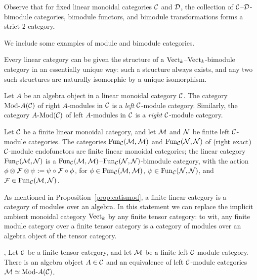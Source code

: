 \documentclass{amsart}
\begin{document}
\nid Observe that for fixed linear monoidal categories $\mathcal C$ and $\mathcal D$, the collection of $\mathcal C$--$\mathcal D$-bimodule categories, bimodule functors, and bimodule transformations forms a strict 2-category.

We include some examples of module and bimodule categories.

\begin{example}
Every linear category can be given the structure of a $\mathrm{Vect}_k$--$\mathrm{Vect}_k$-bimodule category in an essentially unique way: such a structure always exists, and any two such structures are naturally isomorphic by a unique isomorphism.
\end{example} %

\begin{example}
Let $A$ be an algebra object in a linear monoidal category $\mathcal C$.  The category $\Mod{}{A}(\cC)$ of right $A$-modules in $\mathcal C$ is a \emph{left} $\mathcal C$-module category.  Similarly, the category $\Mod{A}{}(\cC)$ of left $A$-modules in $\mathcal C$ is a \emph{right} $\mathcal C$-module category.
\end{example} %

\begin{example}
Let $\mathcal C$ be a finite linear monoidal category, and let $\mathcal M$ and $\mathcal N$ be finite left $\mathcal C$-module categories.  The categories $\operatorname{Fun}_{\mathcal C}(\mathcal M, \mathcal M)$ and $\operatorname{Fun}_{\mathcal C}(\mathcal N, \mathcal N)$ of (right exact) $\mathcal C$-module endofunctors are finite linear monoidal categories; the linear category $\operatorname{Fun}_{\mathcal C}(\mathcal M, \mathcal N)$ is a $\operatorname{Fun}_{\mathcal C}(\mathcal M, \mathcal M)$--$\operatorname{Fun}_{\mathcal C}(\mathcal N, \mathcal N)$-bimodule category, with the action $\phi \otimes \mathcal F \otimes \psi := \psi \circ \mathcal F \circ \phi$, for $\phi \in \operatorname{Fun}_\mathcal C(\mathcal M,\mathcal M)$, $\psi \in \operatorname{Fun}_\mathcal C(\mathcal N,\mathcal N)$, and $\mathcal F \in \operatorname{Fun}_\mathcal C(\mathcal M,\mathcal N)$.
\end{example}

As mentioned in Proposition~\ref{prop:catismod}, a finite linear category is a category of modules over an algebra.  In this statement we can replace the implicit ambient monoidal category $\mathrm{Vect}_k$ by any finite tensor category: to wit, any finite module category over a finite tensor category is a category of modules over an algebra object of the tensor category.

\begin{theorem}{\cite[Thm 2.11.6]{EGNO}, \cite[Thm 1]{MR1976459}} \label{thm:EGNO2.11.6}
Let $\mathcal C$ be a finite tensor category, and let $\mathcal M$ be a finite left $\mathcal C$-module category.  There is an algebra object $A \in \mathcal C$ and an equivalence of left $\mathcal C$-module categories $\cM \simeq \Mod{}{A}(\cC)$.
\end{theorem}
\end{document}
